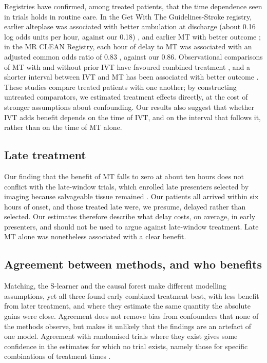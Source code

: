 Registries have confirmed, among treated patients, that the time dependence seen in trials holds in routine care. In the Get With The Guidelines-Stroke registry, earlier alteplase was associated with better ambulation at discharge (about 0.16 log odds units per hour, against our 0.18) \cite{saver2013}, and earlier MT with better outcome \cite{jahan2019}; in the MR CLEAN Registry, each hour of delay to MT was associated with an adjusted common odds ratio of 0.83 \cite{mulder2018}, against our 0.86. Observational comparisons of MT with and without prior IVT have favoured combined treatment \cite{chalos2019,chacon2026}, and a shorter interval between IVT and MT has been associated with better outcome \cite{wagner2022}. These studies compare treated patients with one another; by constructing untreated comparators, we estimated treatment effects directly, at the cost of stronger assumptions about confounding. Our results also suggest that whether IVT adds benefit depends on the time of IVT, and on the interval that follows it, rather than on the time of MT alone.

\subsection{Late treatment}

Our finding that the benefit of MT falls to zero at about ten hours does not conflict with the late-window trials, which enrolled late presenters selected by imaging because salvageable tissue remained \cite{nogueira2018,albers2018,jovin2022,olthuis2023,nguyen2022}. Our patients all arrived within six hours of onset, and those treated late were, we presume, delayed rather than selected. Our estimates therefore describe what delay costs, on average, in early presenters, and should not be used to argue against late-window treatment. Late MT alone was nonetheless associated with a clear benefit.

\subsection{Agreement between methods, and who benefits}

Matching, the S-learner and the causal forest make different modelling assumptions, yet all three found early combined treatment best, with less benefit from later treatment, and where they estimate the same quantity the absolute gains were close. Agreement does not remove bias from confounders that none of the methods observe, but makes it unlikely that the findings are an artefact of one model. Agreement with randomised trials where they exist gives some confidence in the estimates for which no trial exists, namely those for specific combinations of treatment times \cite{hernan2016}.

